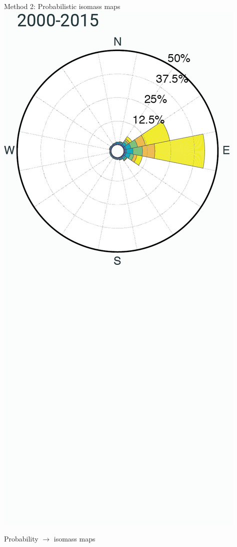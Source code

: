 \documentclass[10pt,aspectratio=169]{beamer}
\begin{document}
\begin{frame}{Method 2: Probabilistic isomass maps}
{    \includegraphics[width=.25\textwidth]{img/wind_all.png}
  }
\end{frame}


\begin{frame}{Probability $\rightarrow$ isomass maps}
\end{frame}
\end{document}
